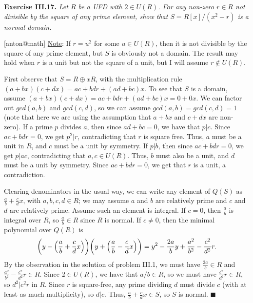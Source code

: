 \documentclass{article}
\makeatletter
\newcommand\<{\triangleleft}
\newenvironment{exercise}[1]{\gdef\currentEx{#1}\begin{trivlist}\item[]%
                \textbf{Exercise #1.} \it}{\end{trivlist}}
\newenvironment{solution}[1]{\def\x{#1}\begin{trivlist}\item[]\hspace*{-.5em}[\x]}
                {\hspace*{\fill} $\blacksquare$
                \protected@write0{}{\currentEx, \x}
                \end{trivlist}}
\makeatother
\begin{document}
 \begin{exercise}{III.17}
   Let $R$ be a UFD with $2\in U(R)$. For any non-zero $r\in R$ not divisible by the
   square of any prime element, show that $S=R[x]/(x^2-r)$ is a normal domain.
 \end{exercise}
 \begin{solution}{anton@math}
   \underline{Note}: If $r=u^2$ for some $u\in U(R)$, then it is not divisible by the
   square of any prime element, but $S$ is obviously not a domain. The result may hold
   when $r$ is a unit but not the square of a unit, but I will assume $r\not\in U(R)$.

   First observe that $S=R\oplus xR$, with the multiplication rule $(a+bx)(c+dx)=ac+bdr+
   (ad+bc)x$. To see that $S$ is a domain, assume $(a+bx)(c+dx)=ac+bdr+ (ad+bc)x = 0+0x$.
   We can factor out $gcd(a,b)$ and $gcd(c,d)$, so we can assume $gcd(a,b)=gcd(c,d)=1$
   (note that here we are using the assumption that $a+bx$ and $c+dx$ are non-zero). If a
   prime $p$ divides $a$, then since $ad+bc=0$, we have that $p|c$. Since $ac+bdr=0$, we
   get $p^2|r$, contradicting that $r$ is square free. Thus, $a$ must be a unit in $R$,
   and $c$ must be a unit by symmetry. If $p|b$, then since $ac+bdr=0$, we get $p|ac$,
   contradicting that $a,c\in U(R)$. Thus, $b$ must also be a unit, and $d$ must be a
   unit by symmetry. Since $ac+bdr=0$, we get that $r$ is a unit, a contradiction.


   Clearing denominators in the usual way, we can write any element of $Q(S)$ as $\frac
   ab +\frac cd x$, with $a,b,c,d\in R$; we may assume $a$ and $b$ are relatively prime
   and $c$ and $d$ are relatively prime. Assume such an element is integral. If $c=0$,
   then $\frac ab$ is integral over $R$, so $\frac ab\in R$ since $R$ is normal. If
   $c\neq 0$, then the minimal polynomial over $Q(R)$ is
   \[
    \biggl(y-\Bigl(\frac ab +\frac cd x\Bigr)\biggr)\biggl(y+\Bigl(\frac ab-\frac cd
    x\Bigr)\biggr) = y^2-\frac{2a}b y + \frac{a^2}{b^2}-\frac{c^2}{d^2}r.
   \]
   By the observation in the solution of problem III.1, we must have $\frac{2a}{b}\in R$
   and $\frac{a^2}{b^2}-\frac{c^2}{d^2}r\in R$. Since $2\in U(R)$, we have that $a/b\in
   R$, so we must have $\frac{c^2}{d^2}r\in R$, so $d^2|c^2r$ in $R$. Since $r$ is
   square-free, any prime dividing $d$ must divide $c$ (with at least as much
   multiplicity), so $d|c$. Thus, $\frac ab +\frac cd x\in S$, so $S$ is normal.
 \end{solution}
\end{document}

